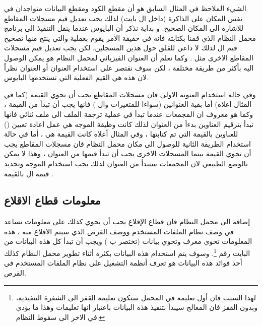 \documentclass[document.tex]{subfiles}
\begin{document}

الشيء الملاحظ في المثال السابق هو أن مقطع الكود  ومقطع البيانات  متواجدان في نفس المكان على الذاكرة (داخل ال  بايت) لذلك يجب تعديل قيم مسجلات المقاطع للاشارة الى المكان الصحيح.
و بداية نذكر أن البايوس عندما ينقل التنفيذ الى برنامج محمل النظام الذي قمنا بكتابته فانه في حقيقة الأمر يقوم بعملية  والتي ينتج منها تصحيح قيم ال  لذلك لا داعي للقلق حول هذين المسجلين، لكن يجب تعديل قيم مسجلات المقاطع الاخرى مثل . وكما نعلم أن العنوان الفيزيائي لمحمل النظام هو  يمكن الوصول اليه بأكثر من  طريقة مختلفة ، لكن سوف نقتصر على استخدام العنوان  أو العنوان  نظراً لان هذه هي القيم الفعلية التي تستخدمها البايوس.

وفي حالة استخدام العنونة الاولى فان مسجلات المقاطع يجب أن تحوي القيمة  (كما في المثال اعلاه) أما بقية العنوانين (سواءا للمتغيرات وال ) فانها يجب أن تبدأ من القيمة ، وكما هو معروف ان المجمعات عندما تبدأ في عملية ترجمة الملف الى ملف ثنائي فانها تبدأ بترقيم العناوين بدءأ من العنوان  لذلك كانت وظيفة الموجه  هي عمل اعادة تعيين () للعناوين بالقيمة التي تم كتابتها ، وفي المثال أعلاه كانت القيمة هي  ، أما في حالة استخدام الطريقة الثانية للوصول الى مكان محمل النظام فان مسجلات المقاطع يجب أن تحوي القيمة  بينما المسجلات الاخرى يجب أن تبدأ قيمها من العنوان  ، وهذا لا يمكن بالوضع الطبيعي لان المجمعات ستبدأ من العنوان  لذلك يجب استخدام الموجه  وتحديد قيمة ال  بالقيمة  .



\subsection{معلومات قطاع الاقلاع}
إضافة الى محمل النظام فان قطاع الإقلاع  يجب أن يحوي كذلك على معلومات تساعد في وصف نظام الملفات المستخدم ووصف القرص الذي سيتم الاقلاع منه ، هذه المعلومات تحوي معرف  وتحوي بيانات  (تختصر ب ) ويجب أن تبدأ كل هذه البيانات من البايت رقم \footnote{لهذا السبب فان أول تعليمة في المحمل ستكون تعليمة القفز الى الشفرة التنفيذية، وبدون القفز فان المعالج سيبدأ بتنفيذ هذه البيانات باعتبار انها تعليمات وهذا ما يؤدي في الاخر الى سقوط النظام.}. وسوف يتم استخدام هذه البيانات بكثرة أثناء تطوير محمل النظام كذلك أحد فوائد هذه البيانات هو  تعرف أنظمة التشغيل على نظام الملفات المستخدم في القرص.
\end{document}
